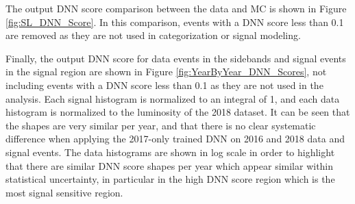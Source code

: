 

The output DNN score comparison between the data
and MC is shown in Figure \ref{fig:SL_DNN_Score}. In this comparison, events with a DNN score less than 0.1 are removed as they are not used in categorization or signal modeling.

Finally, the output DNN score for data events in the sidebands and signal events in the signal region are shown in Figure \ref{fig:YearByYear_DNN_Scores}, not including 
events with a DNN score less than 0.1 as they are not used in the analysis. Each signal histogram is normalized to an integral of 1, and each data histogram is normalized to the luminosity of the 2018 dataset.
It can be seen that the shapes are very similar per year, and that there is no clear systematic difference when applying the 2017-only trained DNN on 
2016 and 2018 data and signal events. The data histograms are shown in log scale in order to highlight that there are similar DNN score shapes per year which appear similar within statistical uncertainty,
in particular in the high DNN score region which is the most signal sensitive region. 

